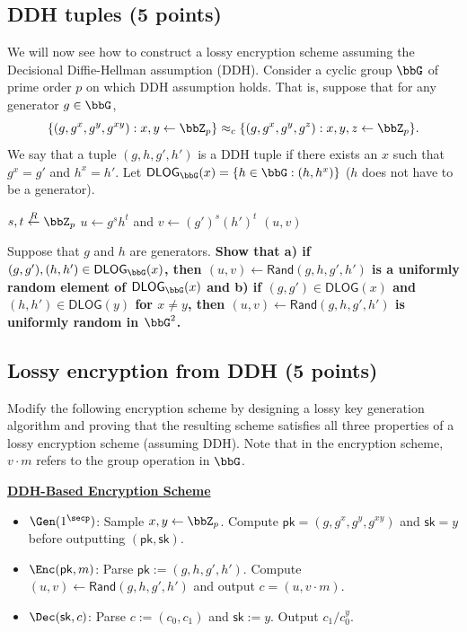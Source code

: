 \documentclass{article}
\newcommand{\proto}[2]{
    \stepcounter{figure}
    \vspace{0.05cm}
    { \small
    \begin{tcolorbox}[breakable]
        \begin{center}
            {\bf \underline{#1}}
        \end{center}
        #2
    \end{tcolorbox} }
}
\newcommand{\pk}{\mathsf{pk}}
\newcommand{\sk}{\mathsf{sk}}
\begin{document}
\subsection{DDH tuples (5 points)}
We will now see how to construct a lossy encryption scheme assuming the Decisional Diffie-Hellman assumption (DDH). Consider a cyclic group $\bbG$ of prime order $p$ on which DDH assumption holds. That is, suppose that for any generator $g \in \bbG$,
        \[ \{ (g, g^x, g^y, g^{xy}): x, y \gets \bbZ_p \} \approx_c \{ (g, g^x, g^y, g^z): x, y, z \gets \bbZ_p \}. \]
We say that a tuple $(g, h, g', h')$ is a DDH tuple if there exists an $x$ such that $g^x = g'$ and $h^x = h'$. Let $\mathsf{DLOG}_\bbG(x) = \{ h \in \bbG : (h, h^x) \} $ ($h$ does not have to be a generator). 

\begin{algorithm}[H]\caption{$\mathsf{Rand}(g, h, g', h')$}
    $s, t \stackrel{R}\gets \bbZ_p$\;
    $u \gets g^s h^t$ and $v \gets (g')^s (h')^t$\;
    \Return $(u, v)$
\end{algorithm}
    
Suppose that $g$ and $h$ are generators. \textbf{Show that a) if $(g, g'), (h, h') \in \mathsf{DLOG}_\bbG(x)$, then $(u, v) \gets \mathsf{Rand}(g, h, g', h')$ is a uniformly random element of $\mathsf{DLOG}_\bbG(x)$ and b) if $(g, g') \in \mathsf{DLOG}(x)$ and $(h, h') \in \mathsf{DLOG}(y)$ for $x \neq y$, then $(u, v) \gets \mathsf{Rand}(g, h, g', h')$ is uniformly random in $\bbG^2$.}

\subsection{Lossy encryption from DDH (5 points)}    
Modify the following encryption scheme by designing a lossy key generation algorithm and proving that the resulting scheme satisfies all three properties of a lossy encryption scheme (assuming DDH). Note that in the encryption scheme, $v \cdot m$ refers to the group operation in $\bbG$.

\proto{DDH-Based Encryption Scheme}{
    \begin{itemize}
        \item $\Gen(1^{\secp})$: Sample $x, y \gets \bbZ_p$. Compute $\pk = (g, g^x, g^y, g^{xy})$ and $\sk = y$ before outputting $(\pk, \sk)$.
        \item $\Enc(\pk, m)$: Parse $\pk := (g, h, g', h')$. Compute $(u, v) \gets \mathsf{Rand}(g, h, g', h')$ and output $c = (u, v \cdot m)$.
        \item $\Dec(\sk, c)$: Parse $c := (c_0, c_1)$ and $\sk := y$. Output $c_1/c_0^y$.
    \end{itemize}
}
\end{document}
